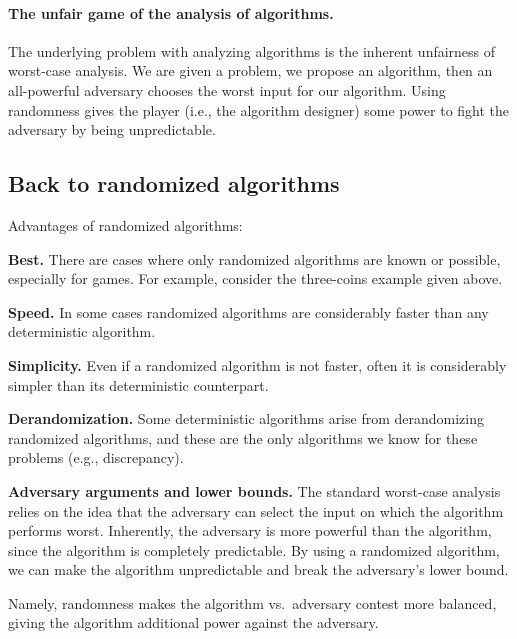 \paragraph*{The unfair game of the analysis of algorithms.}

The underlying problem with analyzing algorithms is the inherent
unfairness of worst-case analysis. We are given a problem, we propose
an algorithm, then an all-powerful adversary chooses the worst input
for our algorithm. Using randomness gives the player (i.e., the
algorithm designer) some power to fight the adversary by being
unpredictable. 



\subsection{Back to randomized algorithms}

Advantages of randomized algorithms:
\begin{compactenumA}
    \item \textbf{Best.} There are cases where only randomized
    algorithms are known or possible, especially for games. For
    example, consider the three-coins example given above.
    
    \smallskip%
    \item \textbf{Speed.} In some cases randomized algorithms are
    considerably faster than any deterministic algorithm.
        
    \smallskip%
    \item \textbf{Simplicity.} Even if a randomized
    algorithm is not faster, often it is considerably simpler than its
    deterministic counterpart.
    
    
    \smallskip%
    \item \textbf{Derandomization.} Some deterministic algorithms
    arise from derandomizing randomized algorithms, and these are
    the only algorithms we know for these problems (e.g., discrepancy).
    
    
    \smallskip%
    \item \textbf{Adversary arguments and lower bounds.} %
    The standard worst-case analysis relies on the idea that the
    adversary can select the input on which the algorithm performs
    worst. Inherently, the adversary is more powerful than the
    algorithm, since the algorithm is completely predictable. By using
    a randomized algorithm, we can make the algorithm unpredictable
    and break the adversary's lower bound.

    Namely, randomness makes the algorithm vs.\ adversary contest
    more balanced, giving the algorithm additional power against the
    adversary.
\end{compactenumA}




